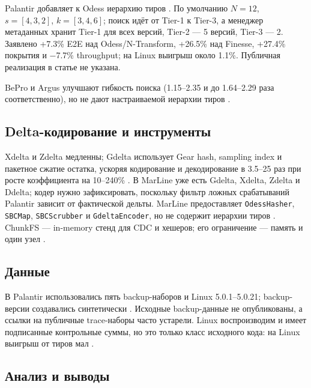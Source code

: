 \documentclass[a4paper]{article}
\begin{document}
Palantir добавляет к Odess иерархию тиров \cite{palantir2024}. По умолчанию $N=12$, $s=[4,3,2]$, $k=[3,4,6]$; поиск идёт от Tier-1 к Tier-3, а менеджер метаданных хранит Tier-1 для всех версий, Tier-2 --- 5 версий, Tier-3 --- 2. Заявлено +7.3\% E2E над Odess/N-Transform, +26.5\% над Finesse, +27.4\% покрытия и −7.7\% throughput; на Linux выигрыш около 1.1\%. Публичная реализация в статье не указана.

BePro и Argus улучшают гибкость поиска (1.15--2.35 и до 1.64--2.29 раза соответственно), но не дают настраиваемой иерархии тиров \cite{bepro2025,argus2025}.

\subsection{Delta-кодирование и инструменты}

Xdelta и Zdelta медленны; Gdelta использует Gear hash, sampling index и пакетное сжатие остатка, ускоряя кодирование и декодирование в 3.5--25 раз при росте коэффициента на 10--240\% \cite{gdelta2024}. В MarLine уже есть Gdelta, Xdelta, Zdelta и Ddelta; кодер нужно зафиксировать, поскольку фильтр ложных срабатываний Palantir зависит от фактической дельты. MarLine предоставляет \texttt{OdessHasher}, \texttt{SBCMap}, \texttt{SBCScrubber} и \texttt{GdeltaEncoder}, но не содержит иерархии тиров \cite{marline}. ChunkFS --- in-memory стенд для CDC и хешеров; его ограничение --- память и один узел \cite{chunkfs}.

\subsection{Данные}

В Palantir использовались пять backup-наборов и Linux 5.0.1--5.0.21; backup-версии создавались синтетически \cite{palantir2024}. Исходные backup-данные не опубликованы, а ссылки на публичные trace-наборы часто устарели. Linux воспроизводим и имеет подписанные контрольные суммы, но это только класс исходного кода: на Linux выигрыш от тиров мал \cite{kernel}.

\subsection{Анализ и выводы}
\end{document}
